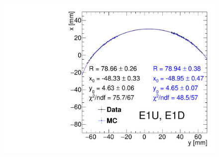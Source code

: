 \begin{figure}[hb]
{  \includegraphics[width=\linewidth,page=4]{graphics/rpSim/Apertures_swapedAxes_withFit.pdf}
}%
\end{figure}
